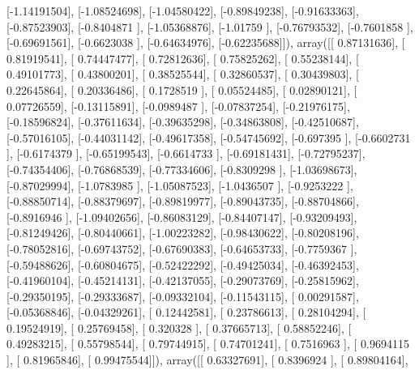 \documentclass{article}
\begin{document}
       [-1.14191504],
       [-1.08524698],
       [-1.04580422],
       [-0.89849238],
       [-0.91633363],
       [-0.87523903],
       [-0.8404871 ],
       [-1.05368876],
       [-1.01759   ],
       [-0.76793532],
       [-0.7601858 ],
       [-0.69691561],
       [-0.6623038 ],
       [-0.64634976],
       [-0.62235688]]), array([[ 0.87131636],
       [ 0.81919541],
       [ 0.74447477],
       [ 0.72812636],
       [ 0.75825262],
       [ 0.55238144],
       [ 0.49101773],
       [ 0.43800201],
       [ 0.38525544],
       [ 0.32860537],
       [ 0.30439803],
       [ 0.22645864],
       [ 0.20336486],
       [ 0.1728519 ],
       [ 0.05524485],
       [ 0.02890121],
       [ 0.07726559],
       [-0.13115891],
       [-0.0989487 ],
       [-0.07837254],
       [-0.21976175],
       [-0.18596824],
       [-0.37611634],
       [-0.39635298],
       [-0.34863808],
       [-0.42510687],
       [-0.57016105],
       [-0.44031142],
       [-0.49617358],
       [-0.54745692],
       [-0.697395  ],
       [-0.6602731 ],
       [-0.6174379 ],
       [-0.65199543],
       [-0.6614733 ],
       [-0.69181431],
       [-0.72795237],
       [-0.74354406],
       [-0.76868539],
       [-0.77334606],
       [-0.8309298 ],
       [-1.03698673],
       [-0.87029994],
       [-1.0783985 ],
       [-1.05087523],
       [-1.0436507 ],
       [-0.9253222 ],
       [-0.88850714],
       [-0.88379697],
       [-0.89819977],
       [-0.89043735],
       [-0.88704866],
       [-0.8916946 ],
       [-1.09402656],
       [-0.86083129],
       [-0.84407147],
       [-0.93209493],
       [-0.81249426],
       [-0.80440661],
       [-1.00223282],
       [-0.98430622],
       [-0.80208196],
       [-0.78052816],
       [-0.69743752],
       [-0.67690383],
       [-0.64653733],
       [-0.7759367 ],
       [-0.59488626],
       [-0.60804675],
       [-0.52422292],
       [-0.49425034],
       [-0.46392453],
       [-0.41960104],
       [-0.45214131],
       [-0.42137055],
       [-0.29073769],
       [-0.25815962],
       [-0.29350195],
       [-0.29333687],
       [-0.09332104],
       [-0.11543115],
       [ 0.00291587],
       [-0.05368846],
       [-0.04329261],
       [ 0.12442581],
       [ 0.23786613],
       [ 0.28104294],
       [ 0.19524919],
       [ 0.25769458],
       [ 0.320328  ],
       [ 0.37665713],
       [ 0.58852246],
       [ 0.49283215],
       [ 0.55798544],
       [ 0.79744915],
       [ 0.74701241],
       [ 0.7516963 ],
       [ 0.9694115 ],
       [ 0.81965846],
       [ 0.99475544]]), array([[ 0.63327691],
       [ 0.8396924 ],
       [ 0.89804164],
\end{document}
